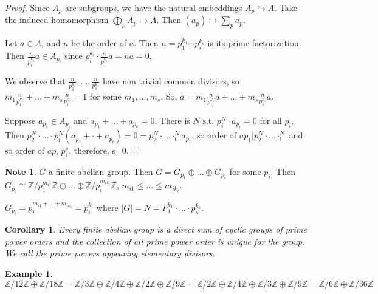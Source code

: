 \documentclass{amsart}
\newtheorem{cor}[thm]{Corollary}
\theoremstyle{definition}
\newtheorem{example}[thm]{Example}
\newtheorem{note}[thm]{Note}
\newcommand{\Z}{\mathbb Z}
\newcommand{\st}{\text{ s.t. }}
\begin{document}
\begin{proof}
Since $A_p$ are subgroups, we have the natural embeddings $A_p\hookrightarrow A$. Take the induced homomorphism $\bigoplus_pA_p\to A$. Then $(a_p)\mapsto \sum_pa_p$.

Let $a\in A$, and $n$ be the order of $a$. Then $n=p_1^{k_1}\cdots p_s^{k_s}$ is its prime factorization. Then $\frac{n}{p_i^{k_i}}a\in A_{p_i}$ since $p_i^{k_i}\cdot\frac{n}{p_1^{k_i}}a=na=0$.

We observe that $\frac{n}{p_1^{k_1}},...,\frac{n}{p_s^{k_s}}$ have non trivial common divisors, so $m_1\frac{n}{p_1^{k_1}}+...+m_s\frac{n}{p_s^{k_s}}=1$ for some $m_1,...,m_s$. So, $a=m_1\frac{n}{p_1^{k_1}}a+...+m_s\frac{n}{p_s^{k_s}}a$.

Suppose $a_{p_1}\in A_{p_i}$ and $a_{p_1}+...+a_{p_k}=0$. There is $N\st p_i^N\cdot a_{p_i}=0$ for all $p_i$. Then $p_2^N\cdot...\cdot p_t^N(a_{p_1}+\cdot +a_{p_t})=0=p_2^N\cdot...\cdotp_t^Na_{p_1}$, so order of $ap_1|p_2^N\cdot...\cdotp_t^N$ and so order of $ap_t|p_1^s$, therefore, s=0.
\end{proof}
\begin{note}
	$G$ a finite abelian group. Then $G=G_{p_1}\oplus...\oplus G_{p_s}$ for some $p_i$. Then $G_{p_i}\cong \Z/p_1^{m_{i1}}\Z\oplus...\oplus \Z/p_i^{m_{tk_i}}\Z$, $m_{i1}\leq ...\leq m_{ik_{i}}$.
	
	$G_{p_i}=p_i^{m_{i1}+...+m_{ik_{s}}}=p_i^{k_i}$ where $|G|=N=P_1^{k_1}\cdot ...\cdot p_s^{k_s}$.
\end{note}
\begin{cor}
	Every finite abelian group is a direct sum of cyclic groups of prime power orders and the collection of all prime power order is unique for the group. We call the prime powers appearing elementary divisors.
\end{cor}
\begin{example}
	$\Z/12\Z\oplus\Z/18\Z=\Z/3\Z\oplus\Z/4\Z\oplus\Z/2\Z\oplus\Z/9\Z=\Z/2\Z\oplus\Z/4\Z\oplus\Z/3\Z\oplus\Z/9\Z=\Z/6\Z\oplus\Z/36\Z$
\end{example}
\end{document}
